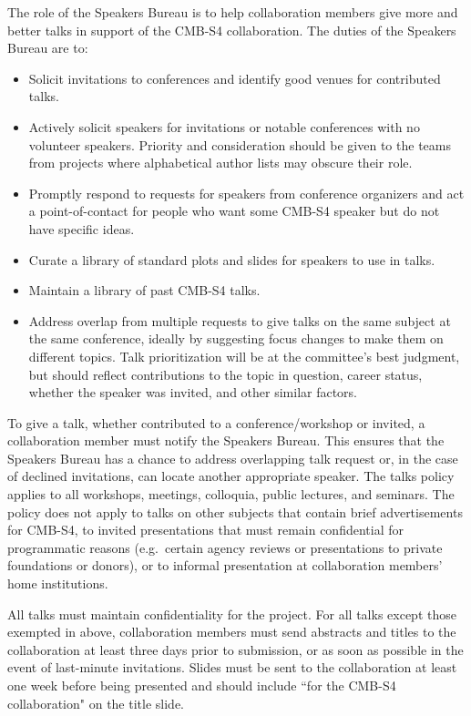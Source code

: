 The role of the Speakers Bureau is to help collaboration members give more and better talks in support of the CMB-S4 collaboration. The duties of the Speakers Bureau are to:
\begin{itemize}
\item Solicit invitations to conferences and identify good venues for contributed talks.
\item Actively solicit speakers for invitations or notable conferences with no volunteer speakers. Priority and consideration should be given to the teams from projects where alphabetical author lists may obscure their role. 
\item Promptly respond to requests for speakers from conference organizers and act a point-of-contact for people who want some CMB-S4 speaker but do not have specific ideas.
\item Curate a library of standard plots and slides for speakers to use in talks.
\item Maintain a library of past CMB-S4 talks.
\item Address overlap from multiple requests to give talks on the same subject at the same conference, ideally by suggesting focus changes to make them on different topics. Talk prioritization will be at the committee's best judgment, but should reflect contributions to the topic in question, career status, whether the speaker was invited, and other similar factors.
\end{itemize}

To give a talk, whether contributed to a conference/workshop or invited,  a collaboration member must notify the Speakers Bureau. This ensures that the Speakers Bureau has a chance to address overlapping talk request or, in the case of declined invitations, can locate another appropriate speaker.  The talks policy applies to all workshops, meetings, colloquia, public lectures, and seminars.  The policy does not apply to talks on other subjects that contain brief advertisements for CMB-S4, to invited presentations that must remain confidential for programmatic reasons (e.g.~certain agency reviews or presentations to private foundations or donors), or to informal presentation at collaboration members' home institutions.  

All talks must maintain confidentiality for the project. For all talks except those exempted in above, collaboration members must send abstracts and titles to the collaboration at least three days prior to submission, or as soon as possible in the event of last-minute invitations. Slides must be sent to the collaboration at least one week before being presented and should include ``for the CMB-S4 collaboration" on the title slide.

